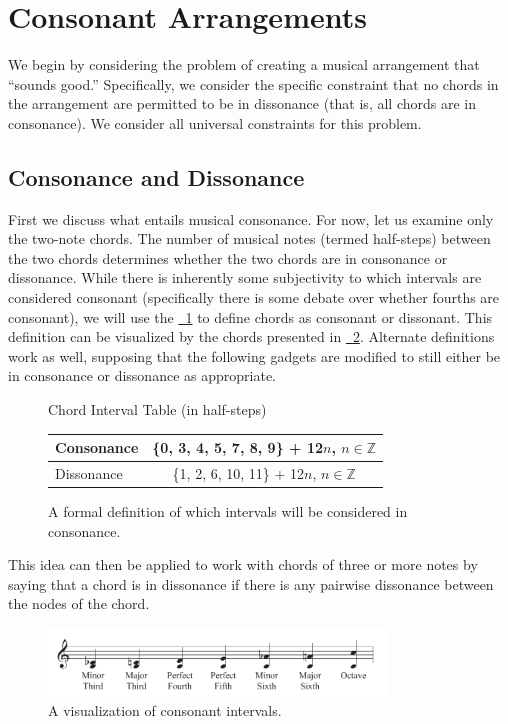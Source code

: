 \documentclass[11pt,letterpaper]{article}
\newcommand{\Z}{\mathbb Z}
\newcommand{\figref}[2][{}]{\hyperref[#2]{\figurename~\ref{#2}#1}}
\begin{document}
\section{Consonant Arrangements}
We begin by considering the problem of creating a musical arrangement that ``sounds good.'' Specifically, we consider the specific constraint that no chords in the arrangement are permitted to be in dissonance (that is, all chords are in consonance). We consider all universal constraints for this problem.

\subsection{Consonance and Dissonance}
First we discuss what entails musical consonance. For now, let us examine only the two-note chords. The number of musical notes (termed half-steps) between the two chords determines whether the two chords are in consonance or dissonance. While there is inherently some subjectivity to which intervals are considered consonant (specifically there is some debate over whether fourths are consonant), we will use the \figref{constab:tab} to define chords as consonant or dissonant. This definition can be visualized by the chords presented in \figref{cons}. Alternate definitions work as well, supposing that the following gadgets are modified to still either be in consonance or dissonance as appropriate.

\begin{figure}[h!]
\centering
Chord Interval Table (in half-steps)\\
\begin{tabular}{ l | c }
  \hline                       
  Consonance & \{0, 3, 4, 5, 7, 8, 9\} + 12$n$, $n\in \Z$ \\
  \hline
  Dissonance & \{1, 2, 6, 10, 11\} + 12$n$, $n\in \Z$\\
  \hline  
\end{tabular}
\caption{A formal definition of which intervals will be considered in consonance.}
\label{constab:tab}
\end{figure}

This idea can then be applied to work with chords of three or more notes by saying that a chord is in dissonance if there is any pairwise dissonance between the nodes of the chord.

\begin{figure}[h!]
  \centering
    \includegraphics[width=0.8\textwidth]{cons2.pdf}
  \caption{A visualization of consonant intervals.}
    \label{cons}
\end{figure}
\end{document}
